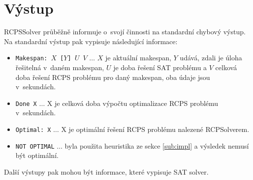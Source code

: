 \documentclass[a4paper, 12pt]{article}
\begin{document}
\section{Výstup}
\label{app:output}
RCPSSolver průběžně informuje o~svojí činnosti na standardní chybový výstup.
Na standardní výstup pak vypisuje následující informace:
\begin{itemize}
    \item \texttt{Makespan: $X$ [$Y$] $U$ $V$} $\ldots$ $X$ je aktuální makespan, $Y$ udává, zdali je úloha řešitelná v~daném makespan,
    $U$ je doba řešení SAT problému a $V$ celková doba řešení RCPS problému pro daný makespan, oba údaje jsou v~sekundách.
    \item \texttt{Done X} $\ldots$ X je celková doba výpočtu optimalizace RCPS problému v~sekundách.
    \item \texttt{Optimal: X} $\ldots$ X je optimální řešení RCPS problému nalezené RCPSolverem.
    \item \texttt{NOT OPTIMAL} $\ldots$ byla použita heuristika ze sekce \ref{sub:impl} a výsledek nemusí být optimální.
\end{itemize}
Další výstupy pak mohou být informace, které vypisuje SAT solver.

\newpage


\end{document}
